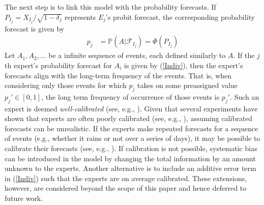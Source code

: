 \documentclass[11pt]{article}
\renewcommand{\P}{\mathbb{P}}
\theoremstyle{definition}
\theoremstyle{definition}
\begin{document}
The next step is to link this model with the probability forecasts. If  $P_{I_j} = X_{I_j}/\sqrt{1-\delta_j}$ represents $E_j$'s probit forecast, the corresponding probability forecast is given by
\begin{align}
p_j &= \P\left(A | \mathcal{F}_{I_j}\right) = \Phi\left( P_{I_j}\right) \label{Indiv}
\end{align}
Let $A_1, A_2, \dots$ be a infinite sequence of events, each defined similarly to $A$. If the $j$th expert's probability forecast for $A_i$ is given by (\ref{Indiv}), then the expert's forecasts align with the long-term frequency of the events. That is, when considering only those events for which $p_j$ takes on some preassigned value $p_j' \in [0, 1]$, the long term frequency of occurrence of those events is $p_j'$. Such an expert is deemed \textit{well-calibrated} (see, e.g., \citet{degroot1983comparison}). Given that several experiments have shown that experts are often poorly calibrated (see, e.g., \citet{cooke1991experts, shlyakhter1994quantifying}), assuming calibrated forecasts can be unrealistic.  If the experts make repeated forecasts for a sequence of events (e.g., whether it rains or not over a series of days), it may be possible to calibrate their forecasts (see, e.g., \citet{foster1998asymptotic, Brier}). If calibration is not possible, systematic bias can be introduced in the model by changing the total information by an amount unknown to the experts. Another alternative is to include an additive error term in (\ref{Indiv}) such that the experts are on average calibrated. 
These extensions, however, are considered beyond the scope of this paper and hence deferred to future work.
\end{document}
